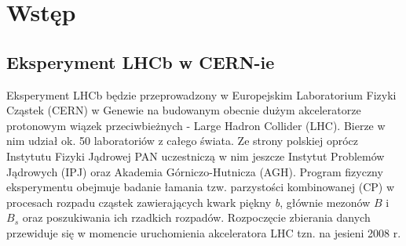 \documentclass{pracamgr}
\begin{document}
\chapter{Wstęp}

\section{Eksperyment LHCb w CERN-ie}

Eksperyment LHCb będzie przeprowadzony w Europejskim Laboratorium Fizyki Cząstek (CERN) w Genewie na budowanym obecnie dużym akceleratorze protonowym wiązek przeciwbieżnych - Large Hadron Collider (LHC). 
Bierze w nim udział ok. 50 laboratoriów z całego świata. Ze strony polskiej oprócz Instytutu Fizyki Jądrowej PAN uczestniczą w nim jeszcze Instytut Problemów Jądrowych (IPJ) oraz Akademia Górniczo-Hutnicza (AGH). Program fizyczny eksperymentu obejmuje badanie łamania tzw. parzystości kombinowanej (CP) w procesach rozpadu cząstek zawierających kwark piękny \textit{b}, głównie mezonów $B$ i $B_s$ oraz poszukiwania ich rzadkich rozpadów. Rozpoczęcie zbierania danych przewiduje się w momencie uruchomienia akceleratora LHC tzn. na jesieni 2008 r.
\\
\end{document}
